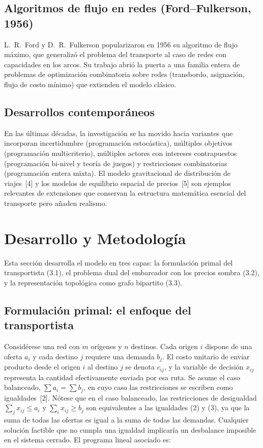 \documentclass[10pt,letterpaper,twocolumn]{article}
\begin{document}
\subsection{Algoritmos de flujo en redes (Ford--Fulkerson, 1956)}
L.~R.~Ford y D.~R.~Fulkerson popularizaron en 1956 su algoritmo de flujo máximo, que generalizó el problema del transporte al caso de redes con capacidades en los arcos. Su trabajo abrió la puerta a una familia entera de problemas de optimización combinatoria sobre redes (transbordo, asignación, flujo de costo mínimo) que extienden el modelo clásico.

\subsection{Desarrollos contemporáneos}
En las últimas décadas, la investigación se ha movido hacia variantes que incorporan incertidumbre (programación estocástica), múltiples objetivos (programación multicriterio), múltiples actores con intereses contrapuestos (programación bi-nivel y teoría de juegos) y restricciones combinatorias (programación entera mixta). El modelo gravitacional de distribución de viajes~[4] y los modelos de equilibrio espacial de precios~[5] son ejemplos relevantes de extensiones que conservan la estructura matemática esencial del transporte pero añaden realismo.

\section{Desarrollo y Metodología}

Esta sección desarrolla el modelo en tres capas: la formulación primal del transportista (3.1), el problema dual del embarcador con los precios sombra (3.2), y la representación topológica como grafo bipartito (3.3).

\subsection{Formulación primal: el enfoque del transportista}

Considérese una red con $m$ orígenes y $n$ destinos. Cada origen $i$ dispone de una oferta $a_i$ y cada destino $j$ requiere una demanda $b_j$. El costo unitario de enviar producto desde el origen $i$ al destino $j$ se denota $c_{ij}$, y la variable de decisión $x_{ij}$ representa la cantidad efectivamente enviada por esa ruta. Se asume el caso balanceado, $\sum a_i = \sum b_j$, en cuyo caso las restricciones se escriben como igualdades~[2]. Nótese que en el caso balanceado, las restricciones de desigualdad $\sum_{j} x_{ij} \leq a_i$ y $\sum_{i} x_{ij} \geq b_j$ son equivalentes a las igualdades (2) y (3), ya que la suma de todas las ofertas es igual a la suma de todas las demandas. Cualquier solución factible que no cumpla una igualdad implicaría un desbalance imposible en el sistema cerrado. El programa lineal asociado es:
\end{document}
